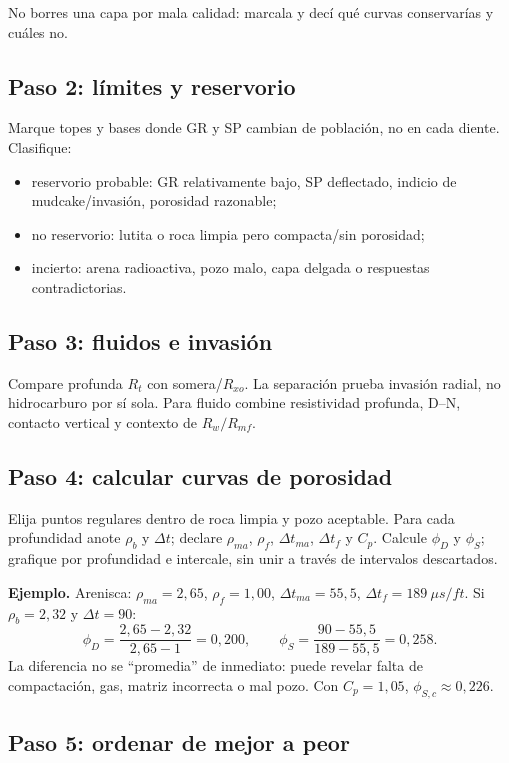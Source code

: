 \documentclass[10.5pt,a4paper]{article}
\begin{document}
No borres una capa por mala calidad: marcala y dec\'i qu\'e curvas conservar\'ias y cu\'ales no.

\subsection{Paso 2: l\'imites y reservorio}

Marque topes y bases donde GR y SP cambian de poblaci\'on, no en cada diente. Clasifique:
\begin{itemize}
  \item reservorio probable: GR relativamente bajo, SP deflectado, indicio de mudcake/invasi\'on, porosidad razonable;
  \item no reservorio: lutita o roca limpia pero compacta/sin porosidad;
  \item incierto: arena radioactiva, pozo malo, capa delgada o respuestas contradictorias.
\end{itemize}

\subsection{Paso 3: fluidos e invasi\'on}

Compare profunda $R_t$ con somera/$R_{xo}$. La separaci\'on prueba invasi\'on radial, no hidrocarburo por s\'i sola. Para fluido combine resistividad profunda, D--N, contacto vertical y contexto de $R_w/R_{mf}$.

\subsection{Paso 4: calcular curvas de porosidad}

Elija puntos regulares dentro de roca limpia y pozo aceptable. Para cada profundidad anote $\rho_b$ y $\Delta t$; declare $\rho_{ma}$, $\rho_f$, $\Delta t_{ma}$, $\Delta t_f$ y $C_p$. Calcule $\phi_D$ y $\phi_S$; grafique por profundidad e intercale, sin unir a trav\'es de intervalos descartados.

\textbf{Ejemplo.} Arenisca: $\rho_{ma}=2{,}65$, $\rho_f=1{,}00$, $\Delta t_{ma}=55{,}5$, $\Delta t_f=189\ \mu s/ft$. Si $\rho_b=2{,}32$ y $\Delta t=90$:
\[
\phi_D=\frac{2{,}65-2{,}32}{2{,}65-1}=0{,}200,
\qquad
\phi_S=\frac{90-55{,}5}{189-55{,}5}=0{,}258.
\]
La diferencia no se ``promedia'' de inmediato: puede revelar falta de compactaci\'on, gas, matriz incorrecta o mal pozo. Con $C_p=1{,}05$, $\phi_{S,c}\approx0{,}226$.

\subsection{Paso 5: ordenar de mejor a peor}
\end{document}
